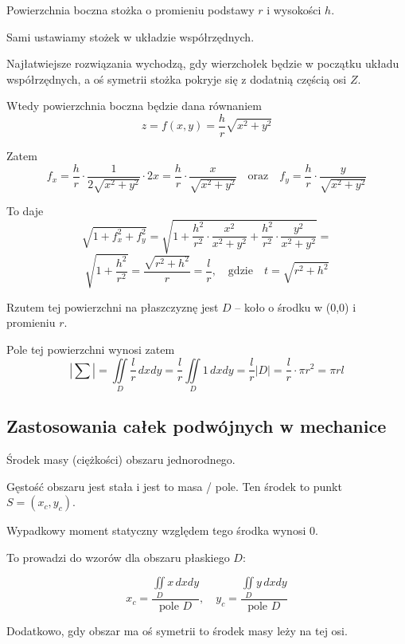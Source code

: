 \begin{przyklad}
    Powierzchnia boczna stożka o promieniu podstawy $r$ i wysokości $h$.

    Sami ustawiamy stożek w układzie współrzędnych.

    Najłatwiejsze rozwiązania wychodzą, gdy wierzchołek będzie w początku układu współrzędnych, a oś symetrii stożka pokryje się z dodatnią częścią osi $Z$.

    Wtedy powierzchnia boczna będzie dana równaniem
    \[ z = f(x,y) = \frac{h}{r} \sqrt{x^2 + y^2} \]

    Zatem
    \[ f_x = \frac{h}{r} \cdot \frac{1}{2 \sqrt{x^2 + y^2}} \cdot 2x = \frac{h}{r} \cdot \frac{x}{\sqrt{x^2 + y^2}} \quad \text{oraz} \quad f_y = \frac{h}{r} \cdot \frac{y}{\sqrt{x^2 + y^2}} \]

    To daje
    \[ \sqrt{1 + f_x^2 + f_y^2} = \sqrt{1 + \frac{h^2}{r^2} \cdot \frac{x^2}{x^2 + y^2} + \frac{h^2}{r^2} \cdot \frac{y^2}{x^2 + y^2}} = \]
    \[ \sqrt{1 + \frac{h^2}{r^2}} = \frac{\sqrt{r^2 + h^2}}{r} = \frac{l}{r}, \quad \text{gdzie} \quad t = \sqrt{r^2 + h^2} \]

    Rzutem tej powierzchni na płaszczyznę jest $D$ -- koło o środku w (0,0) i promieniu $r$.

    Pole tej powierzchni wynosi zatem 
    \[ |\sum| = \iint\limits_D \frac{l}{r} \, dxdy = \frac{l}{r} \iint\limits_D 1 \, dxdy = \frac{l}{r}|D| = \frac{l}{r} \cdot \pi r^2 = \pi r l \]
\end{przyklad}

\subsection{Zastosowania całek podwójnych w mechanice}

Środek masy (ciężkości) obszaru jednorodnego.

Gęstość obszaru jest stała i jest to masa / pole.
Ten środek to punkt \ $ S = (x_c, y_c) $.

Wypadkowy moment statyczny względem tego środka wynosi 0.

To prowadzi do wzorów dla obszaru płaskiego $D$:

\[  x_c = \dfrac{ \displaystyle\iint\limits_D x \, dxdy}{ \text{pole } D }, \quad y_c = \dfrac{\displaystyle\iint\limits_D y \, dx dy}{\text{pole } D} \]
\smallskip

Dodatkowo, gdy obszar ma oś symetrii to środek masy leży na tej osi.

